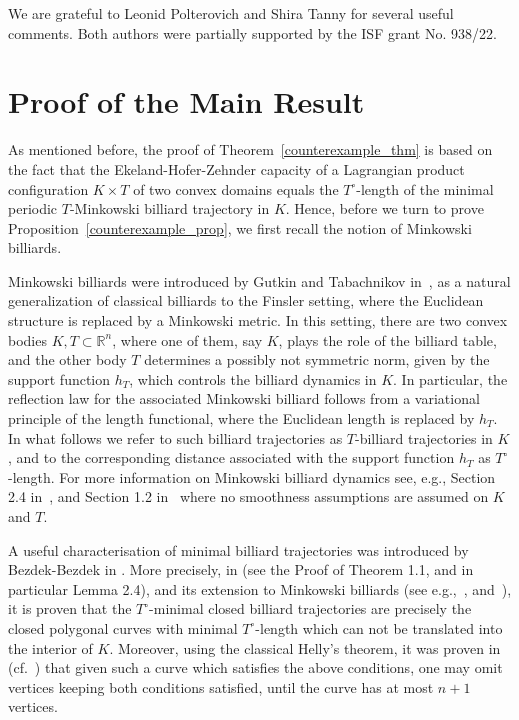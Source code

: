 \documentclass[10pt,a4paper]{article}
\theoremstyle{definition}
\newcommand{\R}{{\mathbb{R}}}
\begin{document}
\medskip 


 We are grateful to Leonid Polterovich and Shira Tanny for several useful comments. Both authors were partially supported by the ISF grant No. 938/22.


\section{Proof of the Main Result}

As mentioned before, the proof of Theorem~\ref{counterexample_thm} is based on the fact that the Ekeland-Hofer-Zehnder capacity of a Lagrangian product configuration $K \times T$ of two convex domains  equals the $T^{\circ}$-length of the minimal periodic $T$-Minkowski billiard trajectory in $K$.
Hence, before we turn to prove Proposition~\ref{counterexample_prop}, we first recall the notion of Minkowski billiards. 


\medskip 

Minkowski billiards were introduced by Gutkin and Tabachnikov in~\cite{GutTab}, as a natural generalization of classical billiards to the Finsler setting, where the Euclidean structure is replaced by a Minkowski metric. 
In this setting, there are two convex bodies $K, T \subset \R^n$, where one of them, say $K$, plays the role of the billiard table, and the other body $T$ determines a possibly not symmetric norm, given by the support function $h_T$, which controls the billiard dynamics in $K$. In particular, the reflection law for the associated Minkowski billiard follows from a variational principle of the length functional, where the Euclidean length is replaced by $h_T$. In what follows we refer to such billiard trajectories as $T$-billiard trajectories in $K$, and to the corresponding distance associated with the support function $h_T$ as $T^{\circ}$-length. For more information on Minkowski billiard dynamics see, e.g., Section 2.4 in~\cite{singular_capacity},
and Section 1.2 in~\cite{Mink-Bill-Rudolf} where no smoothness assumptions are assumed on $K$ and $T$. 


\medskip 

A useful characterisation of minimal billiard trajectories was introduced by Bezdek-Bezdek in \cite{bezdek-bezdek}. More precisely, in \cite{bezdek-bezdek} (see the Proof of Theorem 1.1, and in particular Lemma 2.4), and its extension to Minkowski billiards (see e.g.,~\cite[Theorem 2.1]{non_symmetric_mahler}, and~\cite[Threorem 1]{Mink-Bill-Rudolf}), it is proven that the $T^{\circ}$-minimal closed billiard trajectories are precisely the closed polygonal curves with minimal $T^\circ$-length %
which can not be translated into the interior of $K$.
Moreover,  using the classical Helly's theorem, it was proven in~\cite{bezdek-bezdek} (cf.~\cite{non_symmetric_mahler, Mink-Bill-Rudolf}) that given such a curve which satisfies the above conditions, one may omit vertices keeping 
both conditions satisfied, until the curve has at most $n+1$ vertices.
\end{document}

